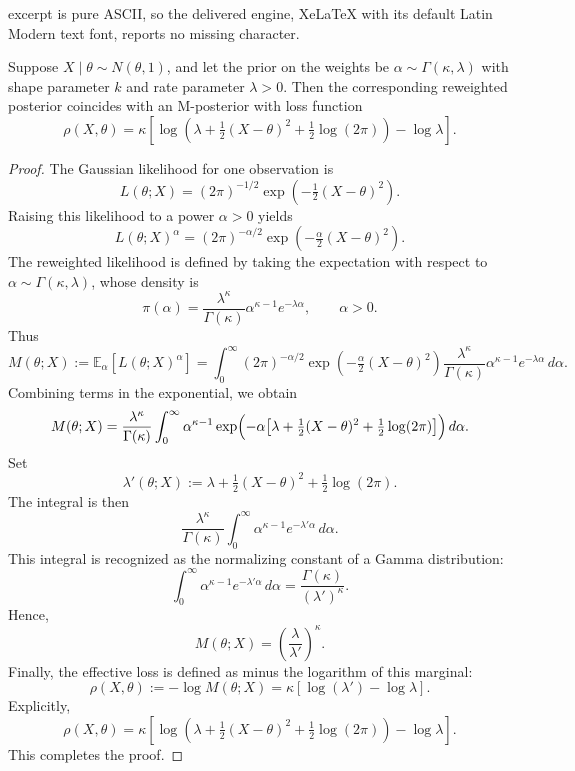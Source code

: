 \documentclass[10pt,a4paper]{amsart}
\begin{document}
excerpt is pure ASCII, so the delivered engine, XeLaTeX with its default Latin Modern text font, reports no missing character.
\begin{lemma}
\label{lemma::calculation-reweighted-posterior-normal}
    Suppose \(X \mid \theta \sim N(\theta,1)\), and let the prior on the weights be \(\alpha \sim \Gamma(\kappa,\lambda)\) with shape parameter \(k\) and rate parameter \(\lambda>0\).
    Then the corresponding reweighted posterior coincides with an M-posterior with loss function
    \[
        \rho(X, \theta) 
        = \kappa\left[ \log \left(\lambda + \tfrac{1}{2}(X-\theta)^2 + \tfrac{1}{2}\log(2\pi)\right) - \log \lambda \right].
    \]
\end{lemma}

\begin{proof}
    The Gaussian likelihood for one observation is
    \[
        L(\theta;X) 
        = (2\pi)^{-1/2} \exp \left(-\tfrac{1}{2}(X-\theta)^2\right).
    \]
    Raising this likelihood to a power \(\alpha > 0\) yields
    \[
        L(\theta;X)^\alpha 
        = (2\pi)^{-\alpha/2} \exp \left(-\tfrac{\alpha}{2}(X-\theta)^2\right).
    \]
    The reweighted likelihood is defined by taking the expectation with respect to \(\alpha \sim \Gamma(\kappa,\lambda)\), whose density is
    \[
        \pi(\alpha) = \frac{\lambda^\kappa}{\Gamma(\kappa)} \alpha^{\kappa-1} e^{-\lambda \alpha}, 
        \qquad \alpha>0.
    \]
    Thus
    \[
        M(\theta;X) := \mathbb{E}_\alpha[L(\theta;X)^\alpha]
        = \int_0^\infty (2\pi)^{-\alpha/2} \exp\left(-\tfrac{\alpha}{2}(X-\theta)^2\right) \frac{\lambda^\kappa}{\Gamma(\kappa)} \alpha^{\kappa-1} e^{-\lambda \alpha}\, d\alpha.
    \]
    Combining terms in the exponential, we obtain
    \[
        M(\theta;X)
        = \frac{\lambda^\kappa}{\Gamma(\kappa)} \int_0^\infty \alpha^{\kappa-1} \exp \Bigl(-\alpha\bigl[\lambda + \tfrac{1}{2}(X-\theta)^2 + \tfrac{1}{2}\log(2\pi)\bigr]\Bigr)\, d\alpha.
    \]
    Set
    \[
        \lambda'(\theta;X) := \lambda + \tfrac{1}{2}(X-\theta)^2 + \tfrac{1}{2}\log(2\pi).
    \]
    The integral is then
    \[
        \frac{\lambda^\kappa}{\Gamma(\kappa)} \int_0^\infty \alpha^{\kappa-1} e^{-\lambda'\alpha}\, d\alpha.
    \]
    This integral is recognized as the normalizing constant of a Gamma distribution:
    \[
        \int_0^\infty \alpha^{\kappa-1} e^{-\lambda'\alpha}\, d\alpha = \frac{\Gamma(\kappa)}{(\lambda')^\kappa}.
    \]
    Hence,
    \[
        M(\theta;X) = \left(\frac{\lambda}{\lambda'}\right)^\kappa.
    \]
    Finally, the effective loss is defined as minus the logarithm of this marginal:
    \[
        \rho(X, \theta) := -\log M(\theta;X) = \kappa\left[\log(\lambda') - \log \lambda\right].
    \]
    Explicitly,
    \[
        \rho(X, \theta) = \kappa\left[ \log \left(\lambda + \tfrac{1}{2}(X-\theta)^2 + \tfrac{1}{2}\log(2\pi)\right) - \log \lambda \right].
    \]
    This completes the proof.
\end{proof}
\end{document}
